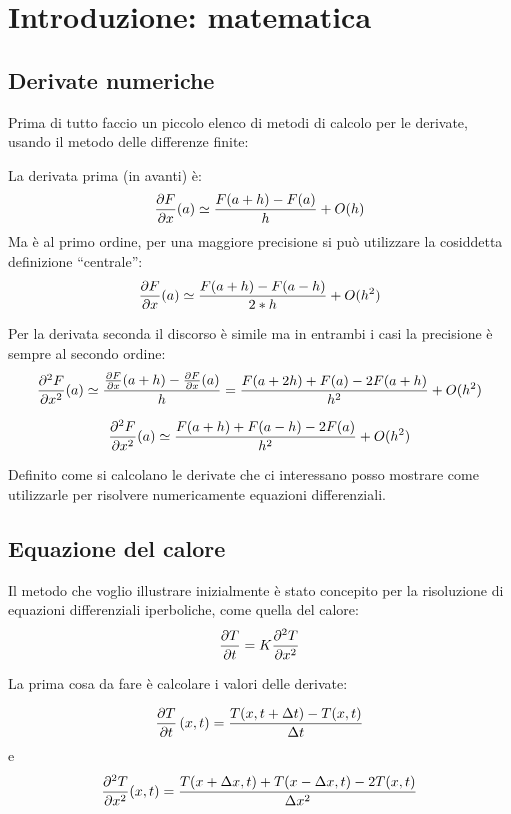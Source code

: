 \section{Introduzione: matematica}
\subsection{Derivate numeriche}
Prima di tutto faccio un piccolo elenco di metodi di calcolo per le derivate, usando il metodo delle differenze finite:

La derivata prima (in avanti) \`e:
\begin{equation}
  \frac{\partial F}{\partial x}(a) \simeq \frac{F(a+h)-F(a)}{h} + O(h)
\end{equation}
Ma \`e al primo ordine, per una maggiore precisione si pu\`o utilizzare la cosiddetta definizione ``centrale'':
\begin{equation}
  \frac{\partial F}{\partial x}(a) \simeq \frac{F(a+h)-F(a-h)}{2*h} + O(h^2)
\end{equation}

Per la derivata seconda il discorso \`e simile ma in entrambi i casi la precisione \`e sempre al secondo ordine:
\begin{equation}
  \frac{\partial ^2F}{\partial x^2}(a) \simeq \frac{\frac{\partial F}{\partial x}(a+h)-\frac{\partial F}{\partial x}(a)}{h} = \frac{F(a+2h)+F(a)-2F(a+h)}{h^2} + O(h^2)
\end{equation}

\begin{equation}
  \frac{\partial ^2F}{\partial x^2}(a) \simeq  \frac{F(a+h)+F(a-h)-2F(a)}{h^2} + O(h^2)
\end{equation}

Definito come si calcolano le derivate che ci interessano posso mostrare come utilizzarle per risolvere numericamente equazioni differenziali.

\subsection{Equazione del calore}
Il metodo che voglio illustrare inizialmente \`e stato concepito per la risoluzione di equazioni differenziali iperboliche, come quella del calore:
\begin{equation}\label{eq:calore}
  \frac{\partial T}{\partial t} =K \frac{\partial ^2T}{\partial x^2}
\end{equation}

La prima cosa da fare \`e calcolare i valori delle derivate:

\begin{equation}
  \frac{\partial T}{\partial t}\left( x,t \right) = \frac{T(x,t+\Delta t)-T(x,t)}{\Delta t}
\end{equation}
e
\begin{equation}
  \frac{\partial ^2T}{\partial x^2}(x,t) = \frac{T(x+\Delta x,t)+T(x-\Delta x,t)-2T(x,t)}{\Delta x^2}
\end{equation}
